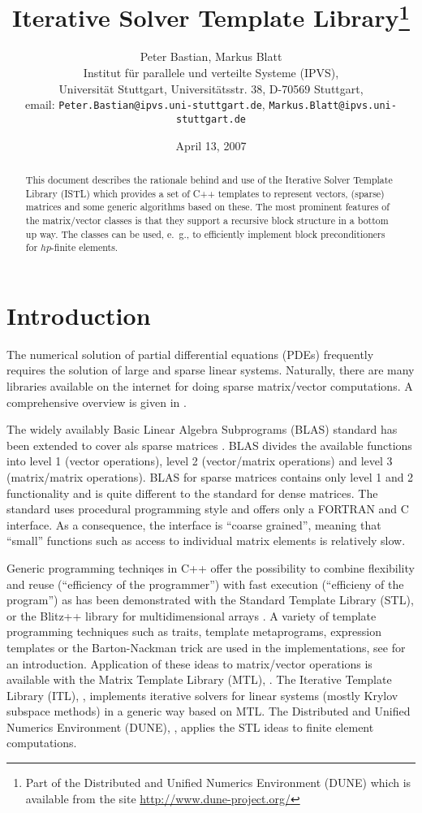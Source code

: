 \documentclass[11pt]{article}
\title{Iterative Solver Template Library\thanks{Part of the
    Distributed and Unified Numerics Environment (DUNE) which is
    available from the site
    \url{http://www.dune-project.org/}}}
\author{%
Peter Bastian, Markus Blatt\\
Institut f\"ur parallele und verteilte Systeme (IPVS),\\
Universit\"at Stuttgart, Universit\"atsstr. 38, D-70569 Stuttgart, \\
email: \texttt{Peter.Bastian@ipvs.uni-stuttgart.de}, \texttt{Markus.Blatt@ipvs.uni-stuttgart.de}}
\date{April 13, 2007}
\begin{document}
\maketitle

\begin{abstract}
This document describes the rationale behind and use of the Iterative
Solver Template Library (ISTL) which provides a set of C++
templates to represent vectors, (sparse) matrices and some generic
algorithms based on these. The most prominent features of the
matrix/vector classes is that they support a recursive block structure
in a bottom up way. The classes can be used, e.~g., to efficiently implement
block preconditioners for $hp$-finite elements.
\end{abstract}

\begin{multicols}{2}
{\small\tableofcontents}
\end{multicols}

\section{Introduction}

The numerical solution of partial differential equations (PDEs) frequently requires the
solution of large and sparse linear systems. Naturally,
there are many libraries available on the internet for doing sparse matrix/vector
computations. A comprehensive overview is given in \cite{LALinks}. 

The
widely availably Basic Linear Algebra Subprograms (BLAS) standard has
been extended to cover als sparse matrices \cite{BLASTForum}. BLAS
divides the available functions into level 1 (vector operations),
level 2 (vector/matrix operations) and level 3 (matrix/matrix
operations). BLAS for sparse matrices contains only level 1 and 2
functionality and is quite different to the standard for dense
matrices. The standard uses procedural programming style and offers
only a FORTRAN and C interface. As a consequence, the interface is
``coarse grained'', meaning that ``small'' functions such as access to
individual matrix elements is relatively slow. 

Generic programming techniqes in C++ offer the possibility to combine
flexibility and reuse (``efficiency of the programmer'') with fast
execution (``efficieny of the program'') as has been demonstrated with
the Standard Template Library (STL), \cite{Stroustrup} or the Blitz++
library for multidimensional arrays \cite{Blitz}. A variety of
template programming techniques such as traits, template metaprograms,
expression templates or the Barton-Nackman trick are used in the
implementations, see \cite{BN,Veldhui99} for an introduction.
Application of these ideas to matrix/vector operations is available
with the Matrix Template Library (MTL), \cite{MTL,MTL_SciTools98}. The Iterative
Template Library (ITL), \cite{ITL}, implements iterative solvers for
linear systems (mostly Krylov subspace methods) in a generic way based
on MTL. The Distributed and Unified Numerics Environment (DUNE),
\cite{Dune,DuneWeb}, applies the STL ideas to finite element
computations. 
\end{document}
